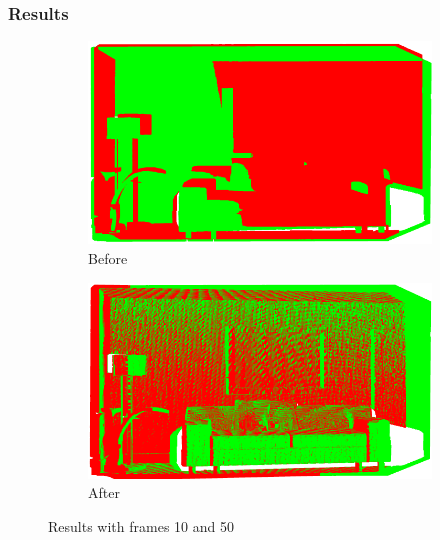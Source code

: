 \documentclass[12pt, a4paper]{article}
\begin{document}
\subsubsection{Results}
\begin{figure}[H]
  \centering
  \begin{subfigure}[b]{0.45\textwidth}
    \includegraphics[width=\textwidth]{./results/icp/point_clouds_10_50_before.png}
    \caption{Before}
  \end{subfigure}
  \hfill
  \begin{subfigure}[b]{0.45\textwidth}
    \includegraphics[width=\textwidth]{./results/icp/point_clouds_10_50_after.png}
    \caption{After}
  \end{subfigure}
  \caption{Results with frames 10 and 50}
\end{figure}
\end{document}
